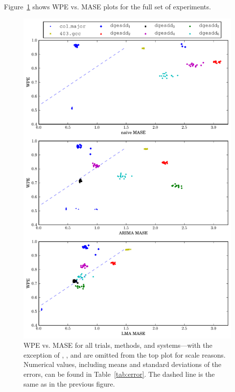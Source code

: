 Figure~\ref{fig:wpe_vs_mase_all} shows WPE vs. MASE plots for the full
set of experiments.
\begin{figure}
  \centering
  \includegraphics[width=\columnwidth]{figs/predictions_vs_entropy3}
\caption{WPE vs. MASE for all trials, methods, and systems---with the
  exception of \svdone, \svdthree, and \svdfive are omitted from the
  top plot for scale reasons.
% 
% 
Numerical values, including means and standard deviations of the
errors, can be found in Table~\ref{tab:error}.  The dashed line is the
same as in the previous figure.
}
    \label{fig:wpe_vs_mase_all}
\end{figure} 
